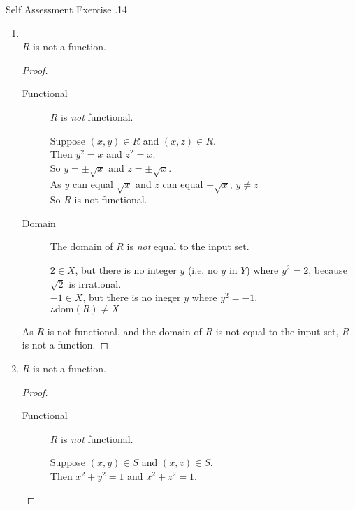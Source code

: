 \documentclass[../notes.tex]{subfiles}
\begin{document}
\begin{exercise}{Self Assessment Exercise \thechapter.14}
\begin{enumerate}
\begin{enumerate}[label=(\alph*)]
\begin{proof}
									\end{proof}
								\item {}\\
									$R$ is not a function.
									\begin{proof}
										$ $
										\begin{description}
											\item[Functional] $R$ is \emph{not} functional.
												\begin{subproof}[Subproof]
													Suppose $(x, y) \in R$ and $(x, z) \in R$.\\
													Then $y^{2} = x$ and $z^{2} = x$.\\
													So $y = \pm \sqrt{x}$ and $z = \pm \sqrt{x}$.\\
													As $y$ can equal $\sqrt{x}$ and $z$ can equal $- \sqrt{x}$, $y \neq z$\\
													So $R$ is not functional.
												\end{subproof}
											\item[Domain] The domain of $R$ is \emph{not} equal to the input set.
												\begin{subproof}[Counterexample]
													$2 \in X$, but there is no integer $y$ (i.e. no $y$ in $Y$) where $y^{2} = 2$, because $\sqrt{2}$ is irrational.\\
													$-1 \in X$, but there is no ineger $y$ where $y^{2} = -1$.\\
													$\therefore \mathrm{dom}(R) \neq X$ 
												\end{subproof}
										\end{description}
										As $R$ is not functional, and the domain of $R$ is not equal to the input set, $R$ is not a function.
									\end{proof}
								\pagebreak
								\item {}
									$R$ is not a function.
									\begin{proof}
										$ $
										\begin{description}
											\item[Functional] $R$ is \emph{not} functional.
												\begin{subproof}[Subproof]
													Suppose $(x, y) \in S$ and $(x, z) \in S$.\\
													Then $x^{2} + y^{2} = 1$ and $x^{2} + z^{2} = 1$.\\

\end{subproof}
\end{description}
\end{proof}
\end{enumerate}
\end{enumerate}
\end{exercise}
\end{document}
